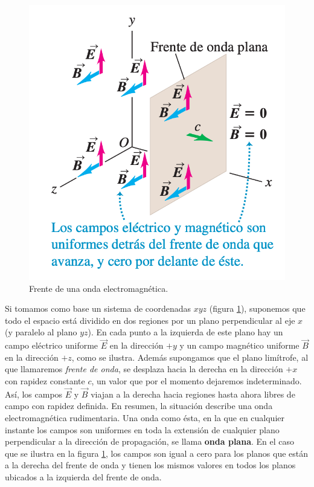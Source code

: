 \begin{figure}[h]
\centering
\includegraphics[scale=0.4]{fig/oeps}
\caption{Frente de una onda electromagnética.}
\label{fig:oeps}
\end{figure}

Si tomamos como base un sistema de coordenadas $xyz$ (figura \ref{fig:oeps}), suponemos que todo el espacio está dividido en dos regiones por un plano perpendicular al eje $x$ (y paralelo al plano $yz$). En cada punto a la izquierda de este plano hay un campo eléctrico uniforme $\vec{E}$ en la dirección $+y$ y un campo magnético uniforme $\vec{B}$ en la dirección $+z$, como se ilustra. Además supongamos que el plano limítrofe, al que llamaremos \textit{frente de onda}, se desplaza hacia la derecha en la dirección $+x$ con rapidez constante $c$, un valor que por el momento dejaremos indeterminado. Así, los campos $\vec{E}$ y $\vec{B}$ viajan a la derecha hacia regiones hasta ahora libres de campo con rapidez definida. En resumen, la situación describe una onda electromagnética rudimentaria. Una onda como ésta, en la que en cualquier instante los campos son uniformes en toda la extensión de cualquier plano perpendicular a la dirección de propagación, se llama \textbf{onda plana}. En el caso que se ilustra en la figura \ref{fig:oeps}, los campos son igual a cero para los planos que están a la derecha del frente de onda y tienen los mismos valores en todos los planos ubicados a la izquierda del frente de onda.

